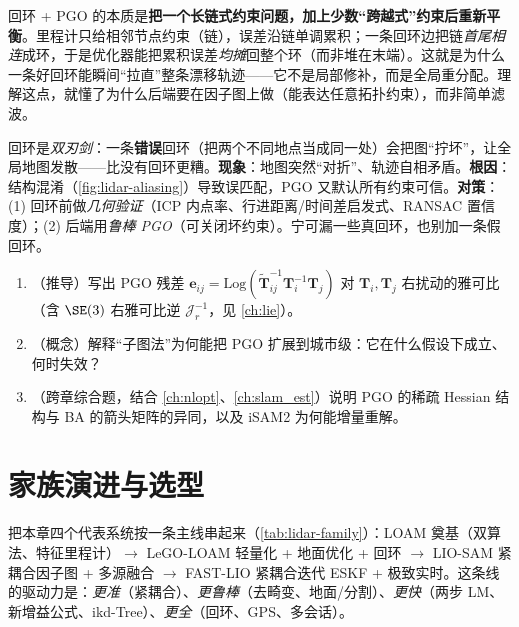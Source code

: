 \begin{insight}
回环 + PGO 的本质是\textbf{把一个长链式约束问题，加上少数“跨越式”约束后重新平衡}。里程计只给相邻节点约束（链），误差沿链单调累积；一条回环边把链\emph{首尾相连}成环，于是优化器能把累积误差\emph{均摊}回整个环（而非堆在末端）。这就是为什么一条好回环能瞬间“拉直”整条漂移轨迹——它不是局部修补，而是全局重分配。理解这点，就懂了为什么后端要在因子图上做（能表达任意拓扑约束），而非简单滤波。
\end{insight}

\begin{pitfall}
回环是\emph{双刃剑}：一条\textbf{错误}回环（把两个不同地点当成同一处）会把图“拧坏”，让全局地图发散——比没有回环更糟。\textbf{现象}：地图突然“对折”、轨迹自相矛盾。\textbf{根因}：结构混淆（\cref{fig:lidar-aliasing}）导致误匹配，PGO 又默认所有约束可信。\textbf{对策}：(1) 回环前做\emph{几何验证}（ICP 内点率、行进距离/时间差启发式、RANSAC 置信度）；(2) 后端用\emph{鲁棒 PGO}（可关闭坏约束）。宁可漏一些真回环，也别加一条假回环。
\end{pitfall}

\begin{practice}
\begin{enumerate}
  \item （推导）写出 PGO 残差 $\mathbf{e}_{ij}=\mathrm{Log}(\tilde{\mathbf{T}}_{ij}^{-1}\mathbf{T}_i^{-1}\mathbf{T}_j)$ 对 $\mathbf{T}_i,\mathbf{T}_j$ 右扰动的雅可比（含 $\SE(3)$ 右雅可比逆 $\boldsymbol{\mathcal{J}}_r^{-1}$，见 \cref{ch:lie}）。
  \item （概念）解释“子图法”为何能把 PGO 扩展到城市级：它在什么假设下成立、何时失效？
  \item （跨章综合题，结合 \cref{ch:nlopt}、\cref{ch:slam_est}）说明 PGO 的稀疏 Hessian 结构与 BA 的箭头矩阵的异同，以及 iSAM2 为何能增量重解。
\end{enumerate}
\end{practice}

\section{家族演进与选型}
\label{sec:lidar-family}

把本章四个代表系统按一条主线串起来（\cref{tab:lidar-family}）：LOAM 奠基（双算法、特征里程计）$\to$ LeGO-LOAM 轻量化 + 地面优化 + 回环 $\to$ LIO-SAM 紧耦合因子图 + 多源融合 $\to$ FAST-LIO 紧耦合迭代 ESKF + 极致实时。这条线的驱动力是：\emph{更准}（紧耦合）、\emph{更鲁棒}（去畸变、地面/分割）、\emph{更快}（两步 LM、新增益公式、ikd-Tree）、\emph{更全}（回环、GPS、多会话）。

